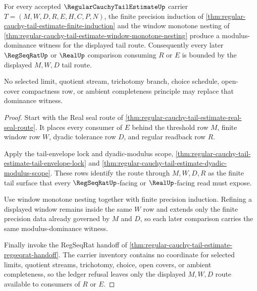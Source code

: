 \begin{theorem}
\label{thm:regular-cauchy-tail-estimate-modulus-dominance-criterion}
For every accepted $\RegularCauchyTailEstimateUp$ carrier
$T=(M,W,D,R,E,H,C,P,N)$, the finite precision induction of
\autoref{thm:regular-cauchy-tail-estimate-finite-induction} and the window
monotone nesting of
\autoref{thm:regular-cauchy-tail-estimate-window-monotone-nesting} produce a
modulus-dominance witness for the displayed tail route. Consequently every
later $\RegSeqRatUp$ or $\RealUp$ comparison consuming $R$ or $E$ is bounded by
the displayed $M,W,D$ tail route.

No selected limit, quotient stream, trichotomy branch, choice schedule,
open-cover compactness row, or ambient completeness principle may replace that
dominance witness.
\end{theorem}
\begin{proof}
Start with the Real seal route of
\autoref{thm:regular-cauchy-tail-estimate-real-seal-route}. It places every
consumer of $E$ behind the threshold row $M$, finite window row $W$, dyadic
tolerance row $D$, and regular readback row $R$.

Apply the tail-envelope lock and dyadic-modulus scope,
\autoref{thm:regular-cauchy-tail-estimate-tail-envelope-lock} and
\autoref{thm:regular-cauchy-tail-estimate-dyadic-modulus-scope}. These rows
identify the route through $M,W,D,R$ as the finite tail surface that every
$\RegSeqRatUp$-facing or $\RealUp$-facing read must expose.

Use window monotone nesting together with finite precision induction. Refining
a displayed window remains inside the same $W$ row and extends only the finite
precision data already governed by $M$ and $D$, so each later comparison carries
the same modulus-dominance witness.

Finally invoke the RegSeqRat handoff of
\autoref{thm:regular-cauchy-tail-estimate-regseqrat-handoff}. The carrier
inventory contains no coordinate for selected limits, quotient streams,
trichotomy, choice, open covers, or ambient completeness, so the ledger refusal
leaves only the displayed $M,W,D$ route available to consumers of $R$ or $E$.
\end{proof}

